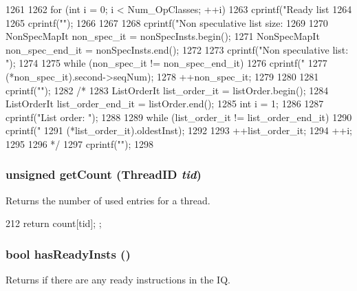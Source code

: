 \begin{DoxyCode}
1261 {
1262     for (int i = 0; i < Num_OpClasses; ++i) {
1263         cprintf("Ready list %
1264 
1265         cprintf("\n");
1266     }
1267 
1268     cprintf("Non speculative list size: %
1269 
1270     NonSpecMapIt non_spec_it = nonSpecInsts.begin();
1271     NonSpecMapIt non_spec_end_it = nonSpecInsts.end();
1272 
1273     cprintf("Non speculative list: ");
1274 
1275     while (non_spec_it != non_spec_end_it) {
1276         cprintf("%
1277                 (*non_spec_it).second->seqNum);
1278         ++non_spec_it;
1279     }
1280 
1281     cprintf("\n");
1282 /*
1283     ListOrderIt list_order_it = listOrder.begin();
1284     ListOrderIt list_order_end_it = listOrder.end();
1285     int i = 1;
1286 
1287     cprintf("List order: ");
1288 
1289     while (list_order_it != list_order_end_it) {
1290         cprintf("%
1291                 (*list_order_it).oldestInst);
1292 
1293         ++list_order_it;
1294         ++i;
1295     }
1296 */
1297     cprintf("\n");
1298 }
\end{DoxyCode}
\hypertarget{classInstQueue_aaf7eb96b7ab2a8240d043b7d82494d15}{
\subsubsection[{getCount}]{\setlength{\rightskip}{0pt plus 5cm}unsigned getCount ({\bf ThreadID} {\em tid})}}
\label{classInstQueue_aaf7eb96b7ab2a8240d043b7d82494d15}
Returns the number of used entries for a thread. 


\begin{DoxyCode}
212 { return count[tid]; };
\end{DoxyCode}
\hypertarget{classInstQueue_ae59aad9cee1e45b5817a9d96553e4567}{
\subsubsection[{hasReadyInsts}]{\setlength{\rightskip}{0pt plus 5cm}bool hasReadyInsts ()}}
\label{classInstQueue_ae59aad9cee1e45b5817a9d96553e4567}
Returns if there are any ready instructions in the IQ. 


